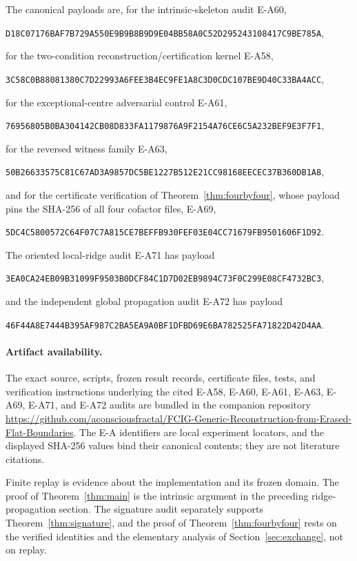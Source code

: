 \documentclass[11pt]{amsart}
\theoremstyle{definition}
\begin{document}
The canonical payloads are, for the intrinsic-skeleton audit E-A60,
\begin{center}
\small\texttt{D18C07176BAF7B729A550E9B9B8B9D9E04BB58A0C52D295243108417C9BE785A},
\end{center}
for the two-condition reconstruction/certification kernel E-A58,
\begin{center}
\small\texttt{3C58C0B88081380C7D22993A6FEE3B4EC9FE1A8C3D0CDC107BE9D40C33BA4ACC},
\end{center}
for the exceptional-centre adversarial control E-A61,
\begin{center}
\small\texttt{76956805B0BA304142CB08D833FA1179876A9F2154A76CE6C5A232BEF9E3F7F1},
\end{center}
for the reversed witness family E-A63,
\begin{center}
\small\texttt{50B26633575C81C67AD3A9857DC5BE1227B512E21CC98168EECEC37B360DB1A8},
\end{center}
and for the certificate verification of Theorem~\ref{thm:fourbyfour}, whose
payload pins the SHA-256 of all four cofactor files, E-A69,
\begin{center}
\small\texttt{5DC4C5800572C64F07C7A815CE7BEFFB930FEF03E04CC71679FB9501606F1D92}.
\end{center}
The oriented local-ridge audit E-A71 has payload
\begin{center}
\small\texttt{3EA0CA24EB09B31099F9503B0DCF84C1D7D02EB9894C73F0C299E08CF4732BC3},
\end{center}
and the independent global propagation audit E-A72 has payload
\begin{center}
\small\texttt{46F44A8E7444B395AF987C2BA5EA9A0BF1DFBD69E6BA782525FA71822D42D4AA}.
\end{center}
\paragraph{Artifact availability.}
The exact source, scripts, frozen result records, certificate files, tests,
and verification instructions underlying the cited E-A58, E-A60, E-A61,
E-A63, E-A69, E-A71, and E-A72 audits are bundled in the companion repository
\url{https://github.com/aconsciousfractal/FCIG-Generic-Reconstruction-from-Erased-Flat-Boundaries}.
The E-A identifiers are local experiment locators, and the displayed SHA-256
values bind their canonical contents; they are not literature citations.

Finite replay is evidence about the implementation and its frozen domain.  The
proof of Theorem~\ref{thm:main} is the intrinsic argument in the preceding
ridge-propagation section.  The signature audit separately supports
Theorem~\ref{thm:signature}, and the proof of Theorem~\ref{thm:fourbyfour}
rests on the verified identities and the elementary analysis of
Section~\ref{sec:exchange}, not on replay.
\end{document}
